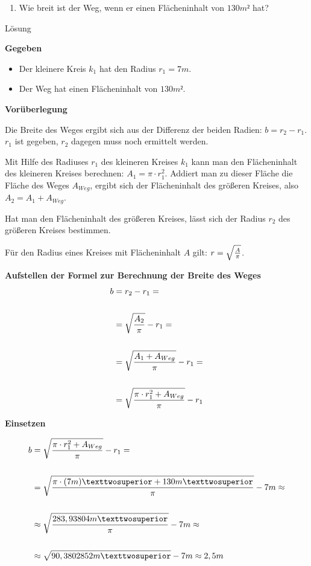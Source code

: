 \documentclass[
  ngerman,
]{book}
\providecommand{\tightlist}{%
  \setlength{\itemsep}{0pt}\setlength{\parskip}{0pt}}
\begin{document}
\begin{enumerate}
\def\labelenumi{\alph{enumi})}
\setcounter{enumi}{1}
\tightlist
\item
  Wie breit ist der Weg, wenn er einen Flächeninhalt von \(130 m²\) hat?
\end{enumerate}

Lösung

\textbf{Gegeben}

\begin{itemize}
\tightlist
\item
  Der kleinere Kreis \(k_1\) hat den Radius \(r_1 = 7m\).
\item
  Der Weg hat einen Flächeninhalt von \(130 m²\).
\end{itemize}

\textbf{Vorüberlegung}

Die Breite des Weges ergibt sich aus der Differenz der beiden Radien: \(b=r_2 - r_1\).
\(r_1\) ist gegeben, \(r_2\) dagegen muss noch ermittelt werden.

Mit Hilfe des Radiuses \(r_1\) des kleineren Kreises \(k_1\) kann man den Flächeninhalt des kleineren Kreises berechnen: \(A_1 = \pi \cdot r^2_1\). Addiert man zu dieser Fläche die Fläche des Weges \(A_{Weg}\), ergibt sich der Flächeninhalt des größeren Kreises, also \(A_2= A_1+ A_{Weg}\).

Hat man den Flächeninhalt des größeren Kreises, lässt sich der Radius \(r_2\) des größeren Kreises bestimmen.

Für den Radius eines Kreises mit Flächeninhalt \(A\) gilt: \(r = \sqrt{A \over \pi}\).

\textbf{Aufstellen der Formel zur Berechnung der Breite des Weges}
\[ \begin{align} b &= r_2 - r_1 = \\
{}\\
                         &= \sqrt{A_2 \over \pi} - r_1=\\
{}\\
                         &= \sqrt{A_1+  A_{Weg} \over \pi} - r_1= \\
                     {}\\
                     & = \sqrt{\pi \cdot r^2_1+  A_{Weg} \over \pi} - r_1
                     \end{align}\]

\textbf{Einsetzen}

\[ \begin{align} b &=\sqrt{\pi \cdot r^2_1+  A_{Weg} \over \pi} - r_1=\\
{}\\
                    &=\sqrt{\pi \cdot (7m)²+  130m² \over \pi} - 7m \approx\\
                    {}\\
                    & \approx \sqrt{ 283,93804 m² \over \pi} - 7m \approx \\
                    {}\\
                    & \approx \sqrt{90,3802852 m²} - 7m \approx 2,5 m \end{align}\]
\end{document}
